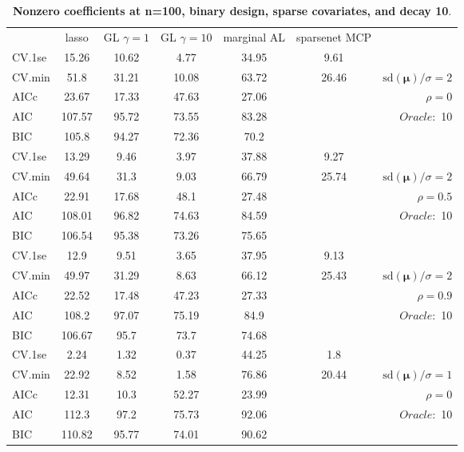 \clearpage
\begin{table}\vspace{-.5cm}
\caption[l]{ { \bf Nonzero coefficients at n=100, binary design, 
sparse covariates, and  decay  10}.}
\vspace{-.5cm}
\footnotesize{}
\begin{center}
\begin{tabular}{l*{5}{c}|r}
& lasso & GL $\gamma=1$ & GL $\gamma=10$ & marginal AL & sparsenet MCP  & \\
 \cline{1-7}
CV.1se & 15.26 & 10.62 & 4.77 & 34.95 & 9.61 & \\
CV.min & 51.8 & 31.21 & 10.08 & 63.72 & 26.46 &  $\mathrm{sd}(\mathbf{\mu})/\sigma=2$ \\
AICc & 23.67 & 17.33 & 47.63 & 27.06 & & $\rho=0$ \\
AIC & 107.57 & 95.72 & 73.55 & 83.28 & &  \multirow{2}{*}{$Oracle: $ 10} \\
BIC & 105.8 & 94.27 & 72.36 & 70.2 & &  \\
 \hline 
CV.1se & 13.29 & 9.46 & 3.97 & 37.88 & 9.27 & \\
CV.min & 49.64 & 31.3 & 9.03 & 66.79 & 25.74 &  $\mathrm{sd}(\mathbf{\mu})/\sigma=2$ \\
AICc & 22.91 & 17.68 & 48.1 & 27.48 & & $\rho=0.5$ \\
AIC & 108.01 & 96.82 & 74.63 & 84.59 & &  \multirow{2}{*}{$Oracle: $ 10} \\
BIC & 106.54 & 95.38 & 73.26 & 75.65 & &  \\
 \hline 
CV.1se & 12.9 & 9.51 & 3.65 & 37.95 & 9.13 & \\
CV.min & 49.97 & 31.29 & 8.63 & 66.12 & 25.43 &  $\mathrm{sd}(\mathbf{\mu})/\sigma=2$ \\
AICc & 22.52 & 17.48 & 47.23 & 27.33 & & $\rho=0.9$ \\
AIC & 108.2 & 97.07 & 75.19 & 84.9 & &  \multirow{2}{*}{$Oracle: $ 10} \\
BIC & 106.67 & 95.7 & 73.7 & 74.68 & &  \\
 \hline 
CV.1se & 2.24 & 1.32 & 0.37 & 44.25 & 1.8 & \\
CV.min & 22.92 & 8.52 & 1.58 & 76.86 & 20.44 &  $\mathrm{sd}(\mathbf{\mu})/\sigma=1$ \\
AICc & 12.31 & 10.3 & 52.27 & 23.99 & & $\rho=0$ \\
AIC & 112.3 & 97.2 & 75.73 & 92.06 & &  \multirow{2}{*}{$Oracle: $ 10} \\
BIC & 110.82 & 95.77 & 74.01 & 90.62 & &  \\

\end{tabular}
\end{center}
\end{table}
